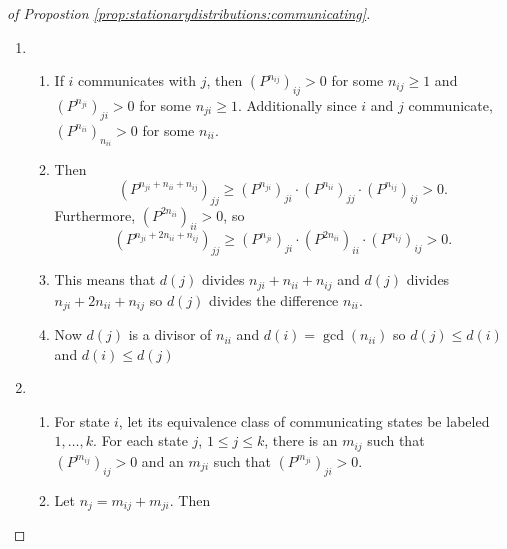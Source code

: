 \documentclass[12pt]{article}
\begin{document}
\begin{enumerate}
\begin{proof}[of Propostion \ref{prop:stationarydistributions:communicating}]
    \begin{enumerate}
        \item
            \begin{enumerate}
                \item
                    If \( i \) communicates with \( j \), then \( (P^{n_
                    {ij}})_{ij} > 0 \) for some \( n_{ij} \ge 1 \) and \(
                    (P^{n_{ji}})_{ji} > 0 \) for some \( n_{ji} \ge 1 \).
                    Additionally since \( i \) and \( j \) communicate, \(
                    (P^{n_{ii}})_{n_{ii}} > 0 \) for some \( n_{ii} \).
                \item
                    Then
                    \[
                        (P^{n_{ji} + n_{ii} + n_{ij}})_{jj} \ge (P^{n_{ji}})_
                        {ji} \cdot (P^{n_{ii}})_{jj} \cdot (P^{n_{ij}})_
                        {ij} > 0.
                    \] Furthermore, \( (P^{2n_{ii}})_{ii} > 0 \), so
                    \[
                        (P^{n_{ji} + 2n_{ii} + n_{ij}})_{jj} \ge (P^{n_{ji}})_
                        {ji} \cdot (P^{2n_{ii}})_{ii} \cdot (P^{n_{ij}})_
                        {ij} > 0.
                    \]
                \item
                    This means that \( d(j) \) divides \( n_{ji} + n_{ii}
                    + n_{ij} \) and \( d(j) \) divides \( n_{ji} + 2n_{ii}
                    + n_{ij} \) so \( d(j) \) divides the difference \(
                    n_{ii} \).
                \item
                    Now \( d(j) \) is a divisor of \( n_{ii} \) and \( d
                    (i) = \gcd(n_{ii}) \) so \( d(j) \le d(i) \) and \(
                    d(i) \le d(j) \)
            \end{enumerate}
        \item
            \begin{enumerate}
                \item
                    For state \( i \), let its equivalence class of
                    communicating states be labeled \( 1, \dots, k \).
                    For each state \( j \), \( 1 \le j \le k \), there
                    is an \( m_{ij} \) such that \( (P^{m_{ij}})_{ij} >
                    0 \) and an \( m_{ji} \) such that \( (P^{m_{ji}})_{ji}
                    > 0 \).
                \item
                    Let \( n_j = m_{ij} + m_{ji} \).  Then

\end{enumerate}
\end{enumerate}
\end{proof}
\end{enumerate}
\end{document}
